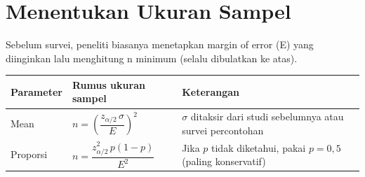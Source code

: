 \documentclass[
  indonesian,
  letterpaper,
]{book}
\newcounter{none} %
\begin{document}

\chapter{Menentukan Ukuran Sampel}\label{menentukan-ukuran-sampel}

Sebelum survei, peneliti biasanya menetapkan margin of error (E) yang
diinginkan lalu menghitung n minimum (selalu dibulatkan ke atas).

{\def\LTcaptype{none} %
\begin{longtable}[]{@{}
  >{\raggedright\arraybackslash}p{}
  >{\raggedright\arraybackslash}p{}
  >{\raggedright\arraybackslash}p{}@{}}
\toprule\noalign{}
\begin{minipage}[b]{\linewidth}\raggedright
Parameter
\end{minipage} & \begin{minipage}[b]{\linewidth}\raggedright
Rumus ukuran sampel
\end{minipage} & \begin{minipage}[b]{\linewidth}\raggedright
Keterangan
\end{minipage} \\
\midrule\noalign{}
\endhead
\bottomrule\noalign{}
\endlastfoot
Mean & \(n = \left(\dfrac{z_{\alpha/2}\,\sigma}{E}\right)^2\) &
\(\sigma\) ditaksir dari studi sebelumnya atau survei percontohan \\
Proporsi & \(n = \dfrac{z_{\alpha/2}^2\,p(1-p)}{E^2}\) & Jika \(p\)
tidak diketahui, pakai \(p = 0{,}5\) (paling konservatif) \\
\end{longtable}
}
\end{document}
